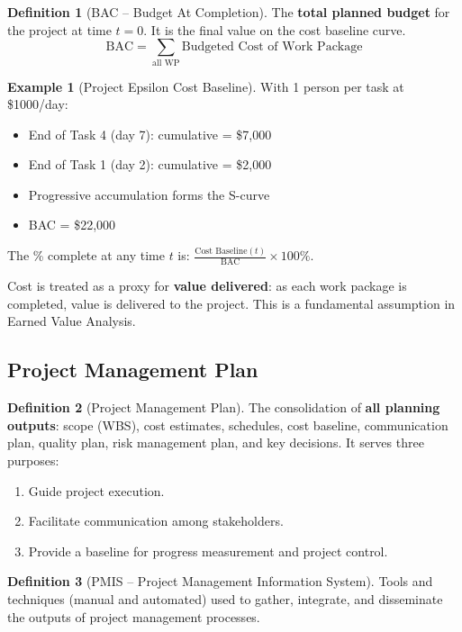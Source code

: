 \documentclass[11pt,a4paper]{article}
\theoremstyle{definition}
\newtheorem{definition}{Definition}[section]
\newtheorem{example}{Example}[section]
\theoremstyle{plain}
\begin{document}
\begin{definition}[BAC -- Budget At Completion]
The \textbf{total planned budget} for the project at time $t=0$. It is the final value on the cost baseline curve.
\[
  \mathrm{BAC} = \sum_{\text{all WP}} \text{Budgeted Cost of Work Package}
\]
\end{definition}

\begin{example}[Project Epsilon Cost Baseline]
With 1 person per task at \$1000/day:
\begin{itemize}[nosep]
  \item End of Task 4 (day 7): cumulative = \$7{,}000
  \item End of Task 1 (day 2): cumulative = \$2{,}000
  \item Progressive accumulation forms the S-curve
  \item BAC = \$22{,}000
\end{itemize}

The \% complete at any time $t$ is: $\frac{\text{Cost Baseline}(t)}{\text{BAC}} \times 100\%$.
\end{example}

\begin{remark}
Cost is treated as a proxy for \textbf{value delivered}: as each work package is completed, value is delivered to the project. This is a fundamental assumption in Earned Value Analysis.
\end{remark}

\subsection{Project Management Plan}

\begin{definition}[Project Management Plan]
The consolidation of \textbf{all planning outputs}: scope (WBS), cost estimates, schedules, cost baseline, communication plan, quality plan, risk management plan, and key decisions. It serves three purposes:
\begin{enumerate}[nosep, label=\arabic*.]
  \item Guide project execution.
  \item Facilitate communication among stakeholders.
  \item Provide a baseline for progress measurement and project control.
\end{enumerate}
\end{definition}

\begin{definition}[PMIS -- Project Management Information System]
Tools and techniques (manual and automated) used to gather, integrate, and disseminate the outputs of project management processes.
\end{definition}
\end{document}
